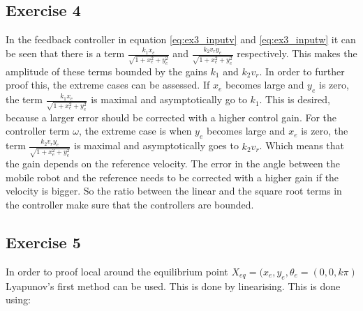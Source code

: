 \subsection{Exercise 4}
In the feedback controller in equation \eqref{eq:ex3_inputv} and \eqref{eq:ex3_inputw} it can be seen that there is a term $\frac{k_1 x_e}{\sqrt{1 + x_e^2 + y_e^2}}$ and $\frac{k_2 v_r y_e}{\sqrt{1 + x_e^2 + y_e^2}}$ respectively. This makes the amplitude of these terms bounded by the gains $k_1$ and $k_2 v_r$. In order to further proof this, the extreme cases can be assessed. If $x_e$ becomes large and $y_e$ is zero, the term $\frac{k_1 x_e}{\sqrt{1 + x_e^2 + y_e^2}}$ is maximal and asymptotically go to $k_1$. This is desired, because a larger error should be corrected with a higher control gain. For the controller term $\omega$, the extreme case is when $y_e$ becomes large and $x_e$ is zero, the term $\frac{k_2 v_r y_e}{\sqrt{1 + x_e^2 + y_e^2}}$ is maximal and asymptotically goes to $k_2 v_r$. Which means that the gain depends on the reference velocity. The error in the angle between the mobile robot and the reference needs to be corrected with a higher gain if the velocity is bigger. So the ratio between the linear and the square root terms in the controller make sure that the controllers are bounded.




\subsection{Exercise 5}
In order to proof local around the equilibrium point $X_{eq} = (x_e, y_e, \theta_e = (0, 0, k\pi)$ Lyapunov's first method can be used. This is done by linearising. This is done using:

